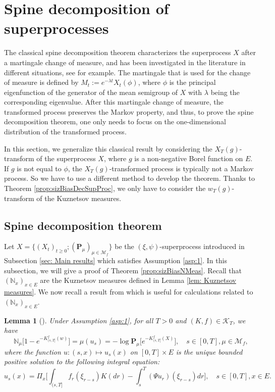 \documentclass[UTF8]{pkuthss}
\theoremstyle{plain}
\newtheorem{lem}[thm]{Lemma}
\theoremstyle{definition}
\numberwithin{equation}{section}
\begin{document}
\section{Spine decomposition of superprocesses}
	The  classical spine decomposition theorem characterizes the superprocess  $X$ after a martingale change of measure, and has been investigated in the literature in different situations, see \cite{EckhoffKyprianouWinkel2015Spines, EnglanderKyprianou2004Local, LiuRenSong2009LlogL} for example.
	The martingale that is used for the change of measure is defined by $M_t := e^{-\lambda t}X_t(\phi)$, where $\phi$ is the principal eigenfunction of the generator of the mean semigroup of $X$ with $\lambda$ being the corresponding eigenvalue.
	After this martingale change of measure, the transformed process preserves the Markov property, and thus, to prove the spine decomposition theorem, one only needs to focus on the one-dimensional distribution of the transformed process.
\par
	In this section, we generalize this classical result by considering the $X_T(g)$-transform of the superprocess $X$, where $g$ is a non-negative Borel function on $E$.
	If $g$ is not equal to $\phi$, the $X_T(g)$-transformed process is typically not a Markov process.
	So we have to use a different method to develop the theorem.
	Thanks to Theorem \ref{prop:sizBiasDecSupProc},
	we only have to consider the $w_T(g)$-transform of the Kuznetsov measures.
\subsection{Spine decomposition theorem}
	Let $X=\{(X_t)_{t\geq 0}; (\mathbf P_\mu)_{\mu \in \mathcal M_f}\}$ be the $(\xi,\psi)$-superprocess introduced in Subsection \ref{sec: Main results} which satisfies Assumption \ref{asp:1}.
	In this subsection, we will give a proof of Theorem \ref{prop:sizBiasNMeas}.
	Recall that $(\mathbb N_x)_{x\in E}$ are the Kuznetsov measures defined in Lemma \ref{lem: Kuznetsov measures}. We now recall a result from \cite{Li2011Measure-valued} which is useful for calculations related to $(\mathbb N_x)_{x\in E}$.
\begin{lem}[{\cite[Theorems 5.15 and 8.23]{Li2011Measure-valued}}]\label{lem:EquatDescNmeas}
	Under Assumption \ref{asp:1}, for all $T> 0$ and $(K,f) \in \mathcal K_T$, we have
\[
	\mathbb N_\mu \big[ 1 - e^{-K_{(s, T]}^f(w)} \big]
	= \mu(u_s)
	= -\log \mathbf P_{\mu} \big[ e^{-K_{(s, T]}^f(X)} \big],
	\quad s\in [0,T], \mu \in \mathcal M_f,
\]
	where the function $u: (s,x) \mapsto u_s(x)$ on $[0,T] \times E$ is the unique bounded positive solution to the following integral equation:
\[
	u_s(x)
    =\Pi_x \Big[\int_{(s,T]} f_r(\xi_{r-s}) K(dr) -
    \int_s^T (\Psi u_r)(\xi_{r-s}) dr \Big],
    \quad s \in [0,T], x \in E.
\]
\end{lem}
\end{document}
